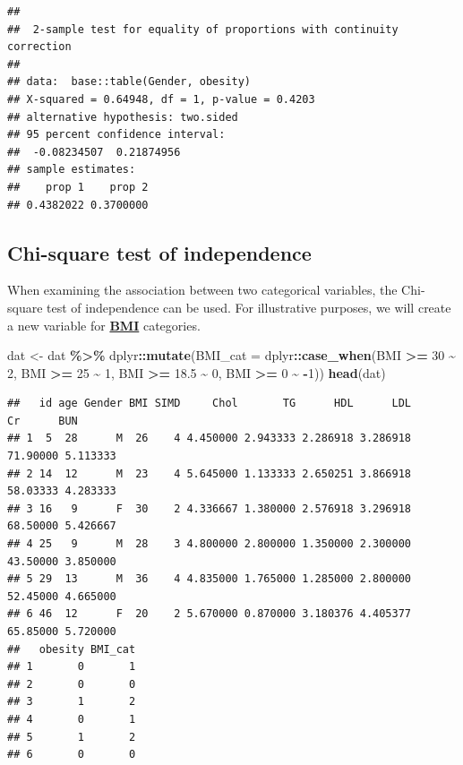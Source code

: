 \documentclass[
]{book}
\newenvironment{Shaded}{\begin{snugshade}}{\end{snugshade}}
\newcommand{\AttributeTok}[1]{\textcolor[rgb]{0.13,0.29,0.53}{#1}}
\newcommand{\DecValTok}[1]{\textcolor[rgb]{0.00,0.00,0.81}{#1}}
\newcommand{\FloatTok}[1]{\textcolor[rgb]{0.00,0.00,0.81}{#1}}
\newcommand{\FunctionTok}[1]{\textcolor[rgb]{0.13,0.29,0.53}{\textbf{#1}}}
\newcommand{\NormalTok}[1]{#1}
\newcommand{\OtherTok}[1]{\textcolor[rgb]{0.56,0.35,0.01}{#1}}
\newcommand{\SpecialCharTok}[1]{\textcolor[rgb]{0.81,0.36,0.00}{\textbf{#1}}}
\begin{document}
\begin{verbatim}
## 
##  2-sample test for equality of proportions with continuity correction
## 
## data:  base::table(Gender, obesity)
## X-squared = 0.64948, df = 1, p-value = 0.4203
## alternative hypothesis: two.sided
## 95 percent confidence interval:
##  -0.08234507  0.21874956
## sample estimates:
##    prop 1    prop 2 
## 0.4382022 0.3700000
\end{verbatim}

\subsection{Chi-square test of independence}\label{sec:chiSqrd}

When examining the association between two categorical variables, the Chi-square test of independence can be used. For illustrative purposes, we will create a new variable for \textbf{\hyperref[acronyms_BMI]{BMI}} categories.

\begin{Shaded}
\begin{Highlighting}[]
\NormalTok{dat }\OtherTok{\textless{}{-}}\NormalTok{ dat }\SpecialCharTok{\%\textgreater{}\%} 
\NormalTok{ dplyr}\SpecialCharTok{::}\FunctionTok{mutate}\NormalTok{(}\AttributeTok{BMI\_cat =}\NormalTok{ dplyr}\SpecialCharTok{::}\FunctionTok{case\_when}\NormalTok{(BMI }\SpecialCharTok{\textgreater{}=} \DecValTok{30} \SpecialCharTok{\textasciitilde{}} \DecValTok{2}\NormalTok{, }
\NormalTok{                            BMI }\SpecialCharTok{\textgreater{}=} \DecValTok{25} \SpecialCharTok{\textasciitilde{}} \DecValTok{1}\NormalTok{, }
\NormalTok{                            BMI }\SpecialCharTok{\textgreater{}=} \FloatTok{18.5} \SpecialCharTok{\textasciitilde{}} \DecValTok{0}\NormalTok{, }
\NormalTok{                            BMI }\SpecialCharTok{\textgreater{}=} \DecValTok{0} \SpecialCharTok{\textasciitilde{}} \SpecialCharTok{{-}}\DecValTok{1}\NormalTok{))}
\FunctionTok{head}\NormalTok{(dat)}
\end{Highlighting}
\end{Shaded}

\begin{verbatim}
##   id age Gender BMI SIMD     Chol       TG      HDL      LDL       Cr      BUN
## 1  5  28      M  26    4 4.450000 2.943333 2.286918 3.286918 71.90000 5.113333
## 2 14  12      M  23    4 5.645000 1.133333 2.650251 3.866918 58.03333 4.283333
## 3 16   9      F  30    2 4.336667 1.380000 2.576918 3.296918 68.50000 5.426667
## 4 25   9      M  28    3 4.800000 2.800000 1.350000 2.300000 43.50000 3.850000
## 5 29  13      M  36    4 4.835000 1.765000 1.285000 2.800000 52.45000 4.665000
## 6 46  12      F  20    2 5.670000 0.870000 3.180376 4.405377 65.85000 5.720000
##   obesity BMI_cat
## 1       0       1
## 2       0       0
## 3       1       2
## 4       0       1
## 5       1       2
## 6       0       0
\end{verbatim}
\end{document}
